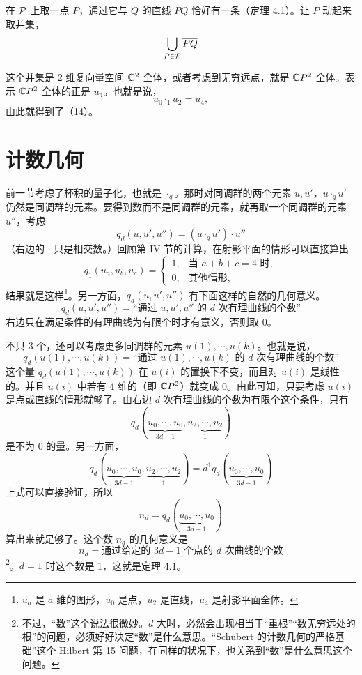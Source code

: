 在 $\mathcal{P}$ 上取一点 $P$，通过它与 $Q$ 的直线 $PQ$ 恰好有一条（定理 4.1）。让 $P$ 动起来取并集，
\[
\bigcup_{P\in\mathcal{P}}\overline{PQ}
\]

这个并集是 2 维复向量空间 $\mathbb{C}^2$ 全体，或者考虑到无穷远点，就是 $\mathbb{C}P^2$ 全体。表示 $\mathbb{C}P^2$ 全体的正是 $u_4$。也就是说，
\[
u_0\cdot_1 u_2 = u_4,
\]
由此就得到了（14）。

\section{计数几何}

前一节考虑了杯积的量子化，也就是 $\cdot_q$。那时对同调群的两个元素 $u,u'$，$u\cdot_q u'$ 仍然是同调群的元素。要得到数而不是同调群的元素，就再取一个同调群的元素 $u''$，考虑
\begin{equation}
q_d(u,u',u'') = (u\cdot_q u')\cdot u'' \tag{20}
\end{equation}
（右边的 $\cdot$ 只是相交数。）回顾第 IV 节的计算，在射影平面的情形可以直接算出
\begin{equation}
q_1(u_a,u_b,u_c) =
\begin{cases}
1, & \text{当 $a+b+c=4$ 时}, \\
0, & \text{其他情形},
\end{cases}
\tag{21}
\end{equation}
结果就是这样\footnote{$u_a$ 是 $a$ 维的图形，$u_0$ 是点，$u_2$ 是直线，$u_4$ 是射影平面全体。}。另一方面，$q_d(u,u',u'')$ 有下面这样的自然的几何意义。
\begin{equation}
q_d(u,u',u'') = \text{“通过 $u,u',u''$ 的 $d$ 次有理曲线的个数”} \tag{22}
\end{equation}
右边只在满足条件的有理曲线为有限个时才有意义，否则取 0。

不只 3 个，还可以考虑更多同调群的元素 $u(1),\cdots,u(k)$。也就是说，
\begin{equation}
q_d(u(1),\cdots,u(k)) = \text{“通过 $u(1),\cdots,u(k)$ 的 $d$ 次有理曲线的个数”} \tag{23}
\end{equation}
这个量 $q_d(u(1),\cdots,u(k))$ 在 $u(i)$ 的置换下不变，而且对 $u(i)$
是线性的。并且 $u(i)$ 中若有 4 维的（即 $\mathbb{C}P^2$）就变成 0。由此可知，只要考虑 $u(i)$ 是点或直线的情形就够了。由右边 $d$ 次有理曲线的个数为有限个这个条件，只有
\[
q_d(\underbrace{u_0,\cdots,u_0}_{3d-1},\underbrace{u_2,\cdots,u_2}_{1})
\]
是不为 0 的量。另一方面，
\[
q_d(\underbrace{u_0,\cdots,u_0}_{3d-1},\underbrace{u_2,\cdots,u_2}_{1})
= d^1 q_d(\underbrace{u_0,\cdots,u_0}_{3d-1})
\]
上式可以直接验证，所以
\begin{equation}
n_d = q_d(\underbrace{u_0,\cdots,u_0}_{3d-1}) \tag{24}
\end{equation}
算出来就足够了。这个数 $n_d$ 的几何意义是
\[
n_d = \text{通过给定的 $3d-1$ 个点的 $d$ 次曲线的个数}
\]
\footnote{不过，“数”这个说法很微妙。$d$ 大时，必然会出现相当于“重根”“数无穷远处的根”的问题，必须好好决定“数”是什么意思。“Schubert 的计数几何的严格基础”这个 Hilbert 第 15 问题，在同样的状况下，也关系到“数”是什么意思这个问题。}。$d=1$ 时这个数是 1，这就是定理 4.1。

